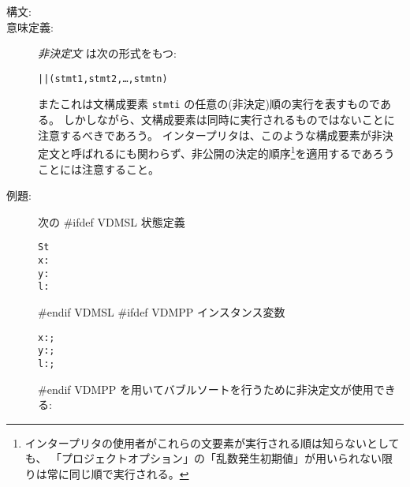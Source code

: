 \documentclass[\pformat,12pt]{jarticle}
\begin{document}
\begin{description}
\item[構文:]
  

\item[意味定義:]  {\it 非決定文} は次の形式をもつ:
  \begin{alltt}
    || (stmt1, stmt2, \ldots, stmtn)
  \end{alltt}
またこれは文構成要素 {\tt  stmti} の任意の(非決定)順の実行を表すものである。
しかしながら、文構成要素は同時に実行されるものではないことに注意するべきであろう。
インタープリタは、このような構成要素が非決定文と呼ばれるにも関わらず、非公開の決定的順序\footnote{インタープリタの使用者がこれらの文要素が実行される順は知らないとしても、 「プロジェクトオプション」の「乱数発生初期値」が用いられない限りは常に同じ順で実行される。}を適用するであろうことには注意すること。

\item[例題:] 次の
#ifdef VDMSL
状態定義
  \begin{alltt}
   St 
    x:
    y:
    l:
  \end{alltt}
#endif VDMSL
#ifdef VDMPP
インスタンス変数
  \begin{alltt}
    x:;
    y:;
    l:;
  \end{alltt}
#endif VDMPP
を用いてバブルソートを行うために非決定文が使用できる:


\end{description}
\end{document}
